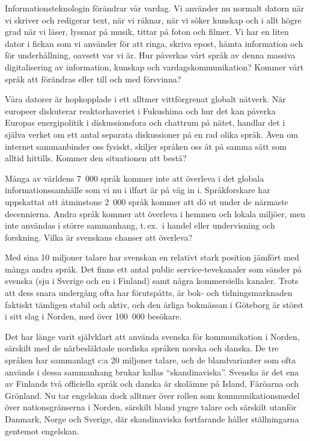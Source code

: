 \frenchspacing
\begin{multicols}{2}

Informationsteknologin förändrar vår vardag. Vi använder nu normalt
datorn när vi skriver och redigerar text, när vi räknar, när vi söker
kunskap och i allt högre grad när vi läser, lyssnar på musik, tittar
på \mbox{foton} och filmer. Vi har en liten dator i fickan som vi använder
för att ringa, skriva epost, hämta information och för underhållning,
oavsett var vi är. Hur påverkas vårt språk av denna massiva
digitalisering av information, kunskap och vardagskommunikation?
Kommer vårt språk att förändras eller till och med försvinna?

Våra datorer är hopkopplade i ett alltmer vittförgrenat globalt
nätverk. När europeer diskuterar reaktorhaveriet i Fukushima och hur
det kan på\-verka \mbox{Europas} energipolitik i diskussionsfora och chattrum
på nätet, handlar det i själva verket om ett \mbox{antal} separata
diskussioner på en rad olika språk. Även om internet sammanbinder oss
fysiskt, skiljer språken oss åt på samma sätt som alltid
hittills. Kommer den situationen att bestå?

Många av världens 7~000 språk kommer inte att överleva i det globala
informationssamhälle som vi nu i ilfart är på väg in i. Språkforskare
har uppskattat att åtminstone 2~000 språk kommer att dö ut under de
närmaste decennierna. Andra språk kommer att överleva i hemmen och
lokala miljöer, men \mbox{inte} användas i större sammanhang, t.\,ex.~i handel
\mbox{eller} under\-visning och forskning. Vilka är svenskans chanser att
överleva?

Med sina 10 miljoner talare har svenskan en relativt stark position
jämfört med många andra språk. Det finns ett antal public
service-tevekanaler som \mbox{sänder} på svenska (sju i Sverige och en i Finland)
samt \mbox{några} kommersiella kanaler. Trots att dess snara undergång \mbox{ofta}
har förutspåtts, är bok- och tidningsmarknaden faktiskt tämligen
stabil och aktiv, och den årliga bokmässan i Göteborg är störst i sitt
slag i Norden, med över 100~000 besökare.

Det har länge varit självklart att använda svenska för kommunikation i
Norden, särskilt med de närbesläktade nordiska språken norska och
danska. De tre språken har sammanlagt c:a 20 miljoner talare, och de
blandvarianter som ofta används i dessa sammanhang brukar kallas
``skandinaviska''. Svenska är det ena av Finlands två officiella språk
och danska är skol\-ämne på Island, Färöarna och Grönland. Nu tar
engelskan dock alltmer över rollen som kommunikationsmedel över
nationsgränserna i Norden, särskilt bland yngre talare och särskilt
utanför Danmark, Norge och Sverige, där skandinaviska fort\-farande
håller ställningarna gentemot engelskan.


\end{multicols}

